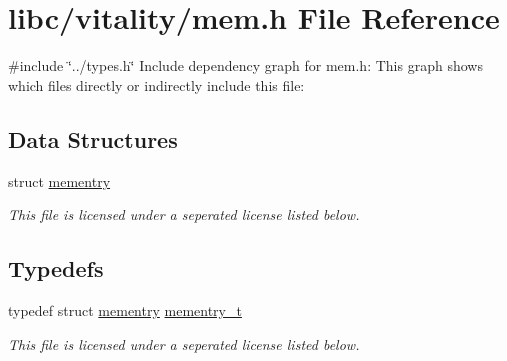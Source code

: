 \hypertarget{a00116}{}\section{libc/vitality/mem.h File Reference}
\label{a00116}
{\ttfamily \#include \char`\"{}../types.\+h\char`\"{}}\newline
Include dependency graph for mem.\+h\+:
This graph shows which files directly or indirectly include this file\+:
\subsection*{Data Structures}
\begin{DoxyCompactItemize}
\item 
struct \hyperlink{a00170}{mementry}
\begin{DoxyCompactList}\small\item\em This file is licensed under a seperated license listed below. \end{DoxyCompactList}\end{DoxyCompactItemize}
\subsection*{Typedefs}
\begin{DoxyCompactItemize}
\item 
typedef struct \hyperlink{a00170}{mementry} \hyperlink{a00116_a876b6ee19692762a87e4673911f9b8da_a876b6ee19692762a87e4673911f9b8da}{mementry\+\_\+t}
\begin{DoxyCompactList}\small\item\em This file is licensed under a seperated license listed below. \end{DoxyCompactList}\end{DoxyCompactItemize}
